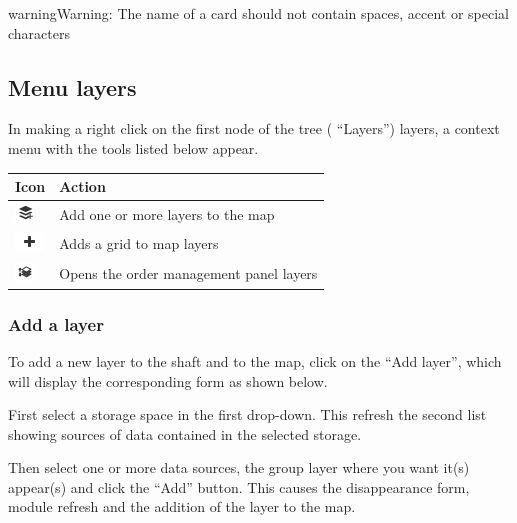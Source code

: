 \documentclass[letterpaper,10pt,english]{sphinxmanual}
\begin{document}
\begin{notice}{warning}{Warning:}
The name of a card should not contain spaces, accent or special characters
\end{notice}


\subsection{Menu layers}
\label{maps/layerstree:menu-couches}
In making a right click on the first node of the tree ( ``Layers'') layers, a context menu with the tools listed below appear.

\begin{tabulary}{\linewidth}{|L|L|}
\hline

\textbf{Icon}
 & 
\textbf{Action}
\\
\hline
\includegraphics{add-layer-m.png}
 & 
Add one or more layers to the map
\\
\hline
\includegraphics{add2.png}
 & 
Adds a grid to map layers
\\
\hline
\includegraphics{move.png}
 & 
Opens the order management panel layers
\\
\hline\end{tabulary}



\subsubsection{Add a layer}
\label{maps/layerstree:ajouter-une-couche}
To add a new layer to the shaft and to the map, click on the ``Add layer'', which will display the corresponding form as shown below.

First select a storage space in the first drop-down. This refresh the second list showing sources of data contained in the selected storage.

Then select one or more data sources, the group layer where you want it(s) appear(s) and click the ``Add'' button. This causes the disappearance form, module refresh and the addition of the layer to the map.
\end{document}
